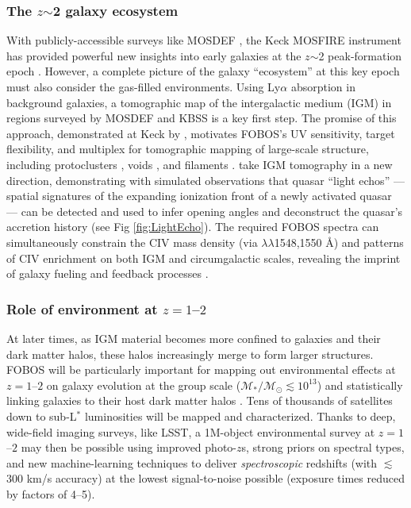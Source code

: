 \subsubsection{The $z$$\sim$2 galaxy ecosystem}
\label{sec:z2galaxies}

With publicly-accessible surveys like MOSDEF \citep{kriek15}, the Keck MOSFIRE instrument has provided powerful new
insights into early galaxies at the $z$$\sim$2 peak-formation epoch \citep[also see KBSS,][]{steidel14}. However, a complete
picture of the galaxy ``ecosystem'' at this key epoch must also consider the gas-filled environments. Using Ly$\alpha$
absorption in background galaxies, a tomographic map of the intergalactic medium (IGM) in regions surveyed by MOSDEF
and KBSS is a key first step. The promise of this approach, demonstrated at Keck by \citet{lee14}, motivates FOBOS's UV
sensitivity, target flexibility, and multiplex for tomographic mapping of large-scale structure, including
protoclusters \citep{lee16,kartaltepe19}, voids \citep{krolewski18}, and filaments \citep{horowitz19}.
\citet{2018arXiv181005156S} take IGM tomography in a new direction, demonstrating with simulated observations that
quasar ``light echos''
--- spatial signatures of the expanding ionization front of a newly
activated quasar --- can be detected and used to infer opening angles
and deconstruct the quasar's accretion history (see Fig
\ref{fig:LightEcho}). The required FOBOS spectra can simultaneously
constrain the CIV mass density (via $\lambda\lambda$1548,1550 \AA)
and patterns of CIV enrichment on both IGM and circumgalactic scales,
revealing the imprint of galaxy fueling and feedback processes
\citep[e.g.,][]{tumlinson17}.

\subsubsection{Role of environment at $z=1$--$2$ }

At later times, as IGM material becomes more confined to galaxies and their dark matter halos, these halos
increasingly merge to form larger structures.  FOBOS will be particularly important for mapping out environmental
effects at $z=1$--$2$ on galaxy evolution at the group scale ($\mathcal{M_\ast/M_\odot} \lesssim 10^{13}$) and
statistically linking galaxies to their host dark matter halos \citep{behroozi19}.  Tens
of thousands of satellites down to sub-L$^*$ luminosities will be mapped and characterized. Thanks to deep, wide-field
imaging surveys, like LSST, a 1M-object environmental survey at $z=1$--$2$ may then be possible using improved
photo-$z$s, strong priors on spectral types, and new machine-learning techniques to deliver {\it spectroscopic}
redshifts (with $\lesssim$300 km/s accuracy) at the lowest signal-to-noise possible (exposure times reduced by factors
of 4--5).

